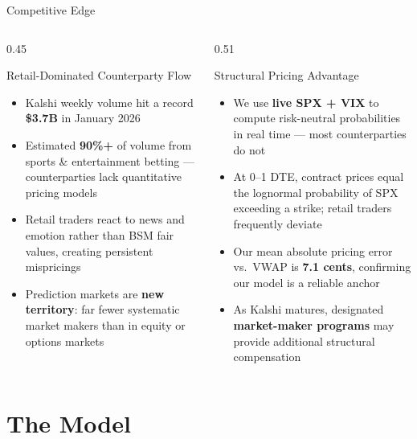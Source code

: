 \documentclass[aspectratio=169]{beamer}
\begin{document}
\begin{frame}[shrink=2]{Competitive Edge}
  \begin{columns}[T,onlytextwidth]
    \begin{column}{0.45\textwidth}
      \begin{block}{Retail-Dominated Counterparty Flow}
        \begin{itemize}\small
          \item Kalshi weekly volume hit a record \textbf{\$3.7B} in January 2026
          \item Estimated \textbf{90\%+} of volume from sports \& entertainment betting --- counterparties lack quantitative pricing models
          \item Retail traders react to news and emotion rather than BSM fair values, creating persistent mispricings
          \item Prediction markets are \textbf{new territory}: far fewer systematic market makers than in equity or options markets
        \end{itemize}
      \end{block}
    \end{column}
    \begin{column}{0.51\textwidth}
      \begin{block}{Structural Pricing Advantage}
        \begin{itemize}\small
          \item We use \textbf{live SPX + VIX} to compute risk-neutral probabilities in real time --- most counterparties do not
          \item At 0--1 DTE, contract prices equal the lognormal probability of SPX exceeding a strike; retail traders frequently deviate
          \item Our mean absolute pricing error vs.\ VWAP is \textbf{7.1 cents}, confirming our model is a reliable anchor
          \item As Kalshi matures, designated \textbf{market-maker programs} may provide additional structural compensation
        \end{itemize}
      \end{block}
    \end{column}
  \end{columns}
\end{frame}

\section{The Model}
\end{document}
